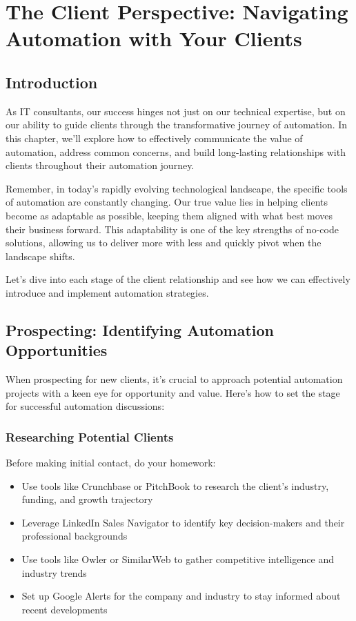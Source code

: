 \chapter{The Client Perspective: Navigating Automation with Your Clients}



\section{Introduction}

As IT consultants, our success hinges not just on our technical expertise, but on our ability to guide clients through the transformative journey of automation. In this chapter, we'll explore how to effectively communicate the value of automation, address common concerns, and build long-lasting relationships with clients throughout their automation journey.

Remember, in today's rapidly evolving technological landscape, the specific tools of automation are constantly changing. Our true value lies in helping clients become as adaptable as possible, keeping them aligned with what best moves their business forward. This adaptability is one of the key strengths of no-code solutions, allowing us to deliver more with less and quickly pivot when the landscape shifts.

Let's dive into each stage of the client relationship and see how we can effectively introduce and implement automation strategies.

\section{Prospecting: Identifying Automation Opportunities}

When prospecting for new clients, it's crucial to approach potential automation projects with a keen eye for opportunity and value. Here's how to set the stage for successful automation discussions:

\subsection{Researching Potential Clients}

Before making initial contact, do your homework:

\begin{itemize}
    \item Use tools like Crunchbase or PitchBook to research the client's industry, funding, and growth trajectory
    \item Leverage LinkedIn Sales Navigator to identify key decision-makers and their professional backgrounds
    \item Use tools like Owler or SimilarWeb to gather competitive intelligence and industry trends
    \item Set up Google Alerts for the company and industry to stay informed about recent developments
\end{itemize}

